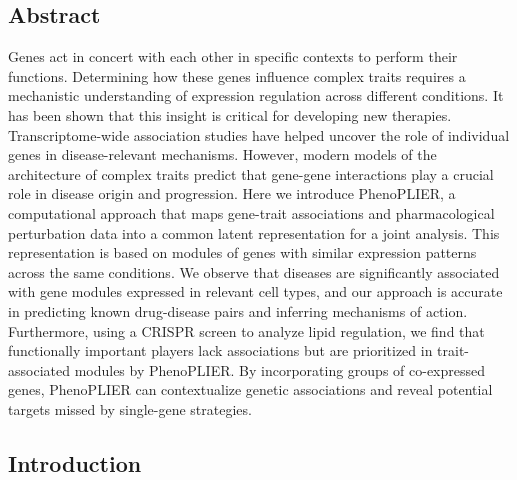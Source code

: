 \documentclass[
  a4paper,
]{article}
\begin{document}
\hypertarget{abstract}{%
\subsection{Abstract}\label{abstract}}

Genes act in concert with each other in specific contexts to perform their functions.
Determining how these genes influence complex traits requires a mechanistic understanding of expression regulation across different conditions.
It has been shown that this insight is critical for developing new therapies.
Transcriptome-wide association studies have helped uncover the role of individual genes in disease-relevant mechanisms.
However, modern models of the architecture of complex traits predict that gene-gene interactions play a crucial role in disease origin and progression.
Here we introduce PhenoPLIER, a computational approach that maps gene-trait associations and pharmacological perturbation data into a common latent representation for a joint analysis.
This representation is based on modules of genes with similar expression patterns across the same conditions.
We observe that diseases are significantly associated with gene modules expressed in relevant cell types, and our approach is accurate in predicting known drug-disease pairs and inferring mechanisms of action.
Furthermore, using a CRISPR screen to analyze lipid regulation, we find that functionally important players lack associations but are prioritized in trait-associated modules by PhenoPLIER.
By incorporating groups of co-expressed genes, PhenoPLIER can contextualize genetic associations and reveal potential targets missed by single-gene strategies.

\hypertarget{introduction}{%
\subsection{Introduction}\label{introduction}}
\end{document}
